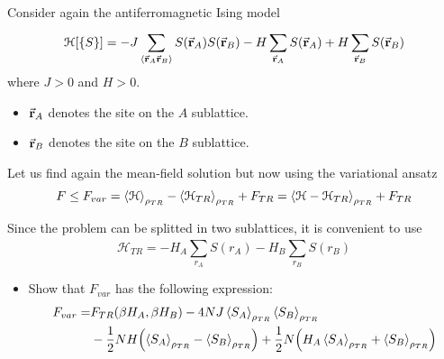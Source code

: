 \documentclass[../main/main.tex]{subfiles}
\begin{document}
\begin{exercise}{}{}
Consider again the antiferromagnetic Ising model
\begin{equation}
  \mathcal{H}[\{ S \}  ] = - J \sum_{\expval{\va{r}_A \va{r}_B} }^{} S (\va{r}_A) S(\va{r}_B) - H \sum_{\va{r}_A}^{} S (\va{r}_A) + H \sum_{\va{r}_B}^{} S (\va{r}_B)
\end{equation}
where \( J>0 \) and \( H>0 \).
\begin{itemize}
\item \( \va{r}_A \) denotes the site on the \( A \) sublattice.
\item \( \va{r}_B \) denotes the site on the \( B \) sublattice.
\end{itemize}

Let us find again the mean-field solution but now using the variational ansatz
\begin{equation}
  F \le F_{var} = \expval{\mathcal{H}}_{\rho _{TR}} - \expval{\mathcal{H}_{TR} }_{\rho _{TR}}  + F_{TR} = \expval{\mathcal{H} - \mathcal{H}_{TR}}_{\rho _{TR}} + F_{TR}
\end{equation}
\begin{remark}
  Since the problem can be splitted in two sublattices, it is convenient to use
  \begin{equation}
    \mathcal{H}_{TR} = - H_A \sum_{r_A}^{} S(r_A) - H_B \sum_{r_B}^{}  S(r_B)
  \end{equation}
\end{remark}

\begin{itemize}
\item Show that \( F_{var} \) has the following expression:
\begin{equation}
\begin{split}
F_{var}  = &  F_{TR} (\beta H_A, \beta H_B)
- 4 NJ \expval{S_A}_{\rho _{TR}}  \expval{S_B}_{\rho _{TR}} \\
 &- \frac{1}{2} NH \qty(\expval{S_A}_{\rho _{TR}}
 - \expval{S_B}_{\rho _{TR}}   )
 + \frac{1}{2} N \qty(H_A \expval{S_A}_{\rho _{TR}}  + \expval{S_B}_{\rho _{TR}}   )
\end{split}
\end{equation}


\end{itemize}
\end{exercise}
\end{document}
